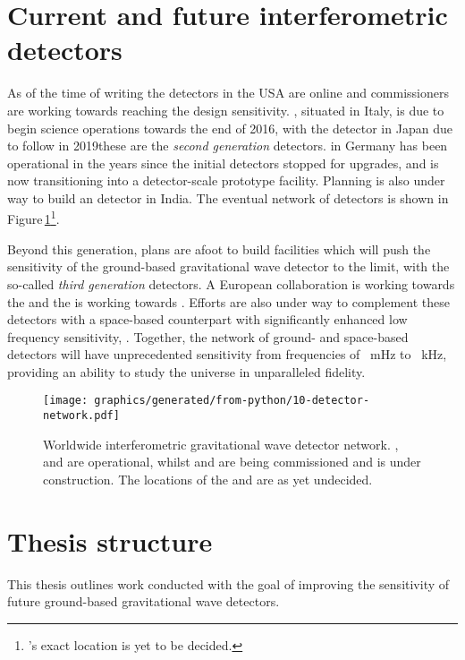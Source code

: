 \section{Current and future interferometric detectors}
As of the time of writing the \ALIGO{} detectors in the USA are online and commissioners are working towards reaching the design sensitivity. \AVIRGO{}, situated in Italy, is due to begin science operations towards the end of 2016, with the \KAGRA{} detector in Japan due to follow in 2019\textemdash these are the \emph{second generation} detectors. \GEO{} in Germany has been operational in the years since the initial detectors stopped for upgrades, and is now transitioning into a detector-scale prototype facility. Planning is also under way to build an \ALIGO{} detector in India. The eventual network of detectors is shown in Figure\,\ref{fig:detector-network}\footnote{\INDIGO{}'s exact location is yet to be decided.}.

Beyond this generation, plans are afoot to build facilities which will push the sensitivity of the ground-based gravitational wave detector to the limit, with the so-called \emph{third generation} detectors. A European collaboration is working towards the \emph{\ET{}} \cite{ET2011} and the \LSC{} is working towards \emph{\LIGOCE{}} \cite{Dwyer2015, aligocosmic2016}. Efforts are also under way to complement these detectors with a space-based counterpart with significantly enhanced low frequency sensitivity, \emph{\ELISA{}} \cite{Amaro-Seoane2012}. Together, the network of ground- and space-based detectors will have unprecedented sensitivity from frequencies of \SI{}{\milli\hertz} to \SI{}{\kilo\hertz}, providing an ability to study the universe in unparalleled fidelity.

\begin{figure}
  \centering
  \texttt{[image: graphics/generated/from-python/10-detector-network.pdf]}
  \caption[Worldwide interferometric gravitational wave detector network]{\label{fig:detector-network}Worldwide interferometric gravitational wave detector network. \GEO{}, \LHO{} and \LLO{} are operational, whilst \VIRGO{} and \KAGRA{} are being commissioned and \INDIGO{} is under construction. The locations of the \ET{} and \LIGOCE{} are as yet undecided.}
\end{figure}

\section{Thesis structure}
This thesis outlines work conducted with the goal of improving the sensitivity of future ground-based gravitational wave detectors.

